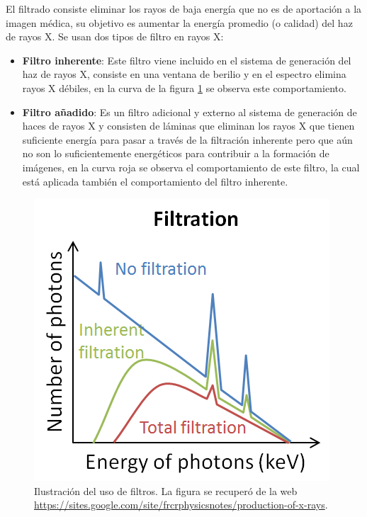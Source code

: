 El filtrado consiste eliminar los rayos de baja energía que no es de aportación a la imagen médica, su objetivo es aumentar la energía promedio (o calidad) del haz de rayos X.  Se usan dos tipos de filtro en rayos X:
\begin{itemize}
  \item \textbf{Filtro inherente}: Este filtro viene incluido en el sistema de generación del haz de rayos X, consiste en una ventana de berilio y en el espectro elimina rayos X débiles, en la curva de la figura \ref{fig:p10} se observa este comportamiento.
  \item \textbf{Filtro añadido}: Es un filtro adicional y externo al sistema de generación de haces de rayos X y consisten de láminas que eliminan los rayos X que tienen suficiente energía para pasar a través de la filtración inherente pero que aún no son lo suficientemente energéticos para contribuir a la formación de imágenes, en la curva roja se observa el comportamiento de este filtro, la cual está aplicada también el comportamiento del filtro inherente.
\end{itemize}
%

\begin{figure}[!ht]
  \center
  \includegraphics[scale=0.8]{./figuras/filtro.png}
  \caption{Ilustración del uso de filtros. La figura se recuperó de la web \url{https://sites.google.com/site/frcrphysicsnotes/production-of-x-rays}.}
  \label{fig:p10}
  \end{figure}









